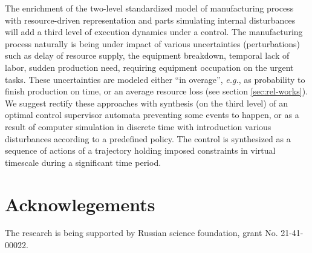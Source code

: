 \documentclass[conference]{IEEEtran}
\begin{document}
The enrichment of the two-level standardized model of manufacturing process with resource-driven representation and parts simulating internal disturbances will add a third level of execution dynamics under a control.  The manufacturing process naturally is being under impact of various uncertainties (perturbations) such as delay of resource supply, the equipment breakdown, temporal lack of labor, sudden production need, requiring equipment occupation on the urgent tasks. These uncertainties are modeled either ``in overage'', \emph{e.g.}, as probability to finish production on time, or an average resource loss (see section \ref{sec:rel-works}).  We suggest rectify these approaches with synthesis (on the third level) of an optimal control supervisor automata preventing some events to happen, or as a result of computer simulation in discrete time with introduction various disturbances according to a predefined policy. The control is synthesized as a sequence of actions of a trajectory holding imposed constraints in virtual timescale during a significant time period.

\section*{Acknowlegements}
\label{sec:ack}

The research is being supported by Russian science foundation, grant No. 21-41-00022.
\end{document}
